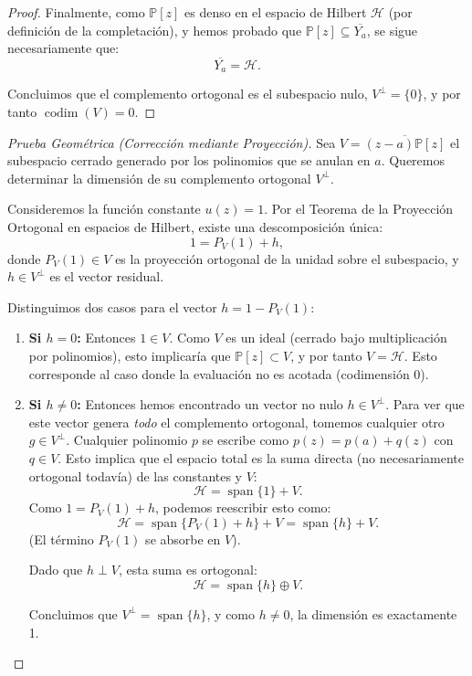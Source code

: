 \documentclass[12pt,a4paper]{article}
\theoremstyle{definition}
\theoremstyle{remark}
\newcommand{\Poly}{\mathbb{P}[z]}
\begin{document}
\begin{proof}
    Finalmente, como $\Poly$ es denso en el espacio de Hilbert $\mathcal{H}$ (por definición de la completación), y hemos probado que $\Poly \subseteq \overline{Y_a}$, se sigue necesariamente que:
    $$ \overline{Y_a} = \mathcal{H}. $$

    Concluimos que el complemento ortogonal es el subespacio nulo, $V^\perp = \{0\}$, y por tanto $\operatorname{codim}(V) = 0$.
\end{proof}

\begin{proof}[Prueba Geométrica (Corrección mediante Proyección)]
    Sea $V = \overline{(z-a)\Poly}$ el subespacio cerrado generado por los polinomios que se anulan en $a$. Queremos determinar la dimensión de su complemento ortogonal $V^\perp$.

    Consideremos la función constante $u(z) = 1$. Por el Teorema de la Proyección Ortogonal en espacios de Hilbert, existe una descomposición única:
    $$ 1 = P_V(1) + h, $$
    donde $P_V(1) \in V$ es la proyección ortogonal de la unidad sobre el subespacio, y $h \in V^\perp$ es el vector residual.

    Distinguimos dos casos para el vector $h = 1 - P_V(1)$:

    \begin{enumerate}
        \item \textbf{Si $h = 0$:} Entonces $1 \in V$. Como $V$ es un ideal (cerrado bajo multiplicación por polinomios), esto implicaría que $\Poly \subset V$, y por tanto $V = \mathcal{H}$. Esto corresponde al caso donde la evaluación no es acotada (codimensión 0).

        \item \textbf{Si $h \neq 0$:} Entonces hemos encontrado un vector no nulo $h \in V^\perp$.
              Para ver que este vector genera \textit{todo} el complemento ortogonal, tomemos cualquier otro $g \in V^\perp$.
              Cualquier polinomio $p$ se escribe como $p(z) = p(a) + q(z)$ con $q \in V$.
              Esto implica que el espacio total es la suma directa (no necesariamente ortogonal todavía) de las constantes y $V$:
              $$ \mathcal{H} = \operatorname{span}\{1\} + V. $$
              Como $1 = P_V(1) + h$, podemos reescribir esto como:
              $$ \mathcal{H} = \operatorname{span}\{P_V(1) + h\} + V = \operatorname{span}\{h\} + V. $$
              (El término $P_V(1)$ se absorbe en $V$).

              Dado que $h \perp V$, esta suma es ortogonal:
              $$ \mathcal{H} = \operatorname{span}\{h\} \oplus V. $$

              Concluimos que $V^\perp = \operatorname{span}\{h\}$, y como $h \neq 0$, la dimensión es exactamente 1.
    \end{enumerate}
\end{proof}
\end{document}
